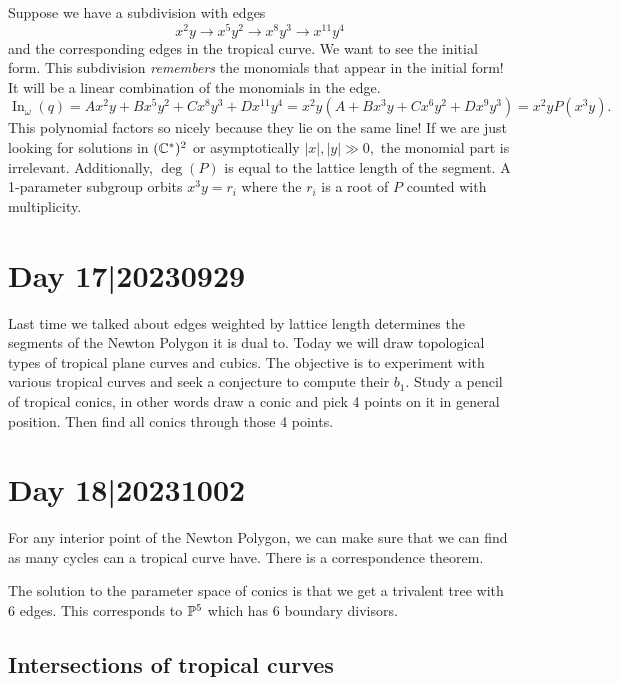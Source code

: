 \documentclass[12pt]{memoir}
\theoremstyle{definition}
\begin{document}
\begin{Ex}
    Suppose we have a subdivision with edges 
    $$x^2y\to x^5y^2\to x^8y^3\to x^11y^4$$
    and the corresponding edges in the tropical curve. We want to see the initial form. This subdivision \emph{remembers} the monomials that appear in the initial form! It will be a linear combination of the monomials in the edge.
    $$\operatorname{In}_\omega(q)=Ax^2y+Bx^5y^2+Cx^8y^3+Dx^{11}y^4=x^2y(A+Bx^3y+Cx^6y^2+Dx^9y^3)=x^2yP(x^3y).$$
    This polynomial factors so nicely because they lie on the same line! If we are just looking for solutions in $(\mathbb{C}^\ast)^2$ or asymptotically $|x|,|y|\gg 0,$ the monomial part is irrelevant. Additionally, $\deg(P)$ is equal to the lattice length of the segment. A 1-parameter subgroup orbits $x^3y=r_i$ where the $r_i$ is a root of $P$ counted with multiplicity.    
\end{Ex}




\section{Day 17|20230929}

Last time we talked about edges weighted by lattice length determines the segments of the Newton Polygon it is dual to. Today we will draw topological types of tropical plane curves and cubics. The objective is to experiment with various tropical curves and seek a conjecture to compute their $b_1$. Study a pencil of tropical conics, in other words draw a conic and pick 4 points on it in general position. Then find all conics through those 4 points.

\section{Day 18|20231002}%




For any interior point of the Newton Polygon, we can make sure that we can find as many cycles can a tropical curve have. There is a correspondence theorem.\par 
The solution to the parameter space of conics is that we get a trivalent tree with $6$ edges. This corresponds to $\mathbb{P}^5$ which has $6$ boundary divisors.

\subsection{Intersections of tropical curves}
\end{document}
